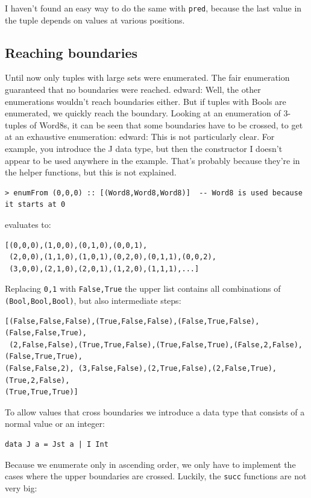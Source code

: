 \documentclass{tmr}
\newcommand{\authornote}[3]{{\color{#2} {\sc #1}: #3}}
\newcommand\bay[1]{\authornote{edward}{blue}{#1}}
\begin{document}
I haven't found an easy way to do the same with \verb|pred|, because the last value in the tuple depends on values at various positions.

\subsection{Reaching boundaries}
Until now only tuples with large sets were enumerated. The fair enumeration guaranteed that no boundaries were reached.  \bay{Well, the other enumerations wouldn't reach boundaries either.} But if tuples with Bools are enumerated, we quickly reach the boundary. Looking at an enumeration of 3-tuples of Word8s, it can be seen that some boundaries have to be crossed, to get at an exhaustive enumeration: \bay{This is not particularly clear. For example, you introduce the J data type, but then the constructor I doesn't appear to be used anywhere in the example.  That's probably because they're in the helper functions, but this is not explained.}

\begin{Verbatim}
> enumFrom (0,0,0) :: [(Word8,Word8,Word8)]  -- Word8 is used because it starts at 0
\end{Verbatim}

evaluates to:

\begin{Verbatim}
[(0,0,0),(1,0,0),(0,1,0),(0,0,1),
 (2,0,0),(1,1,0),(1,0,1),(0,2,0),(0,1,1),(0,0,2),
 (3,0,0),(2,1,0),(2,0,1),(1,2,0),(1,1,1),...]
\end{Verbatim}
Replacing \verb|0,1| with \verb|False,True| the upper list contains all combinations of \verb|(Bool,Bool,Bool)|, but also intermediate steps:
\begin{Verbatim}
[(False,False,False),(True,False,False),(False,True,False),(False,False,True),
 (2,False,False),(True,True,False),(True,False,True),(False,2,False),(False,True,True),
(False,False,2), (3,False,False),(2,True,False),(2,False,True),(True,2,False),
(True,True,True)]
\end{Verbatim}

To allow values that cross boundaries we introduce a data type that consists of a normal value or an integer:
\begin{Verbatim}
data J a = Jst a | I Int
\end{Verbatim}
Because we enumerate only in ascending order, we only have to implement the cases where the upper boundaries are crossed. Luckily, the \verb|succ| functions are not very big:
\end{document}
